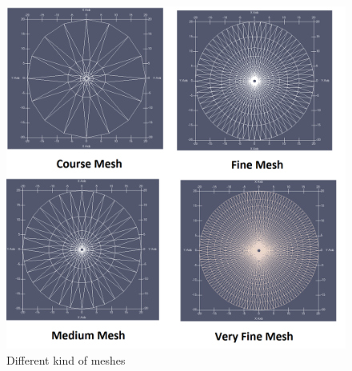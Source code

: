 \documentclass[12pt]{elsarticle}
\begin{document}
	\begin{figure}[h]\label{cylinder_grid}
		\centering\includegraphics[width=1.0\linewidth]{figure_grid2}
		\caption{Different kind of meshes}
	\end{figure}
	
\end{document}
